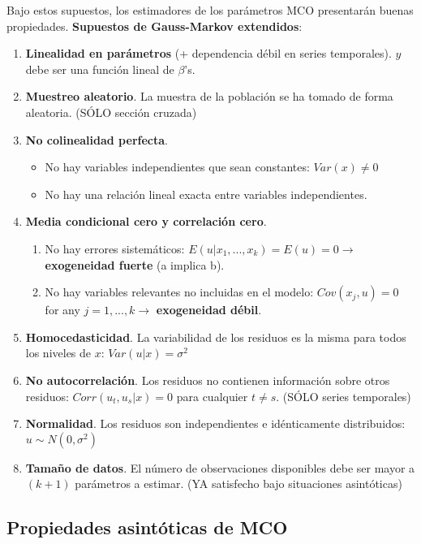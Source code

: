 \documentclass[10pt, a4paper, landscape]{extarticle}
\begin{document}
\begin{multicols}{3}
Bajo estos supuestos, los estimadores de los parámetros MCO presentarán buenas propiedades. \textbf{Supuestos de Gauss-Markov extendidos}:

\begin{enumerate}[leftmargin=*]
\item \textbf{Linealidad en parámetros} (+ dependencia débil en series temporales). $y$ debe ser una función lineal de $\beta$'s.
\item \textbf{Muestreo aleatorio}. La muestra de la población se ha tomado de forma aleatoria. (SÓLO sección cruzada)
\item \textbf{No colinealidad perfecta}.
\begin{itemize}[leftmargin=*]
\item No hay variables independientes que sean constantes: $Var(x) \neq 0$
\item No hay una relación lineal exacta entre variables independientes.
\end{itemize}
\item \textbf{Media condicional cero y correlación cero}.
\begin{enumerate}[leftmargin=*, label=\alph*.]
\item No hay errores sistemáticos: $E(u | x_1, ..., x_k) = E(u) = 0 \rightarrow$ \textbf{exogeneidad fuerte} (a implica b).
\item No hay variables relevantes no incluidas en el modelo: $Cov(x_j , u) = 0$ for any $j = 1, ..., k \rightarrow$ \textbf{exogeneidad débil}.
\end{enumerate}
\item \textbf{Homocedasticidad}. La variabilidad de los residuos es la misma para todos los niveles de $x$: $Var(u | x) = \sigma^2$
\item \textbf{No autocorrelación}. Los residuos no contienen información sobre otros residuos: $Corr(u_t, u_s | x) = 0$ para cualquier $t \neq s$. (SÓLO series temporales)
\item \textbf{Normalidad}. Los residuos son independientes e idénticamente distribuidos: $u \sim N(0,\sigma^2)$
\item \textbf{Tamaño de datos}. El número de observaciones disponibles debe ser mayor a $(k + 1)$ parámetros a estimar. (YA satisfecho bajo situaciones asintóticas)
\end{enumerate}

\subsection*{Propiedades asintóticas de MCO}


\end{multicols}
\end{document}
